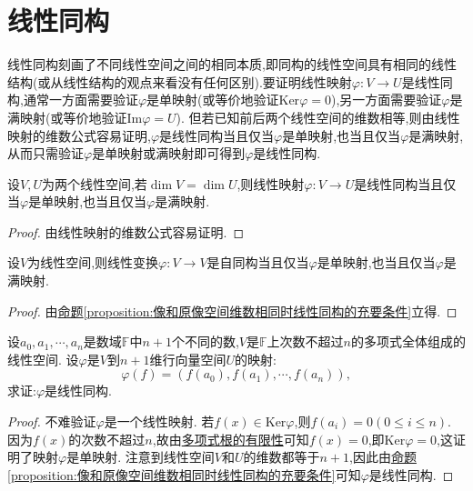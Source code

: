 \documentclass[lang=cn,newtx,10pt,scheme=chinese]{elegantbook}
\begin{document}
\section{线性同构}
线性同构刻画了不同线性空间之间的相同本质,即同构的线性空间具有相同的线性结构(或从线性结构的观点来看没有任何区别).要证明线性映射\(\varphi:V\to U\)是线性同构,通常一方面需要验证\(\varphi\)是单映射(或等价地验证\(\text{Ker}\varphi = 0\)),另一方面需要验证\(\varphi\)是满映射(或等价地验证\(\text{Im}\varphi = U\)). 但若已知前后两个线性空间的维数相等,则由线性映射的维数公式容易证明,\(\varphi\)是线性同构当且仅当\(\varphi\)是单映射,也当且仅当\(\varphi\)是满映射,从而只需验证\(\varphi\)是单映射或满映射即可得到\(\varphi\)是线性同构.

\begin{proposition}\label{proposition:像和原像空间维数相同时线性同构的充要条件}
设$V,U$为两个线性空间,若\(\dim V = \dim U\),则线性映射\(\varphi:V\rightarrow U\)是线性同构当且仅当\(\varphi\)是单映射,也当且仅当\(\varphi\)是满映射.
\end{proposition}
\begin{proof}
由线性映射的维数公式容易证明.
\end{proof}

\begin{corollary}\label{corollary:线性变换自同构的充要条件}
设$V$为线性空间,则线性变换\(\varphi:V\rightarrow V\)是自同构当且仅当\(\varphi\)是单映射,也当且仅当\(\varphi\)是满映射.
\end{corollary}
\begin{proof}
由\hyperref[proposition:像和原像空间维数相同时线性同构的充要条件]{命题\ref{proposition:像和原像空间维数相同时线性同构的充要条件}}立得.
\end{proof}

\begin{lemma}\label{lemma:证明Lagrange插值公式}
设\(a_0,a_1,\cdots,a_n\)是数域\(\mathbb{F}\)中\(n + 1\)个不同的数,\(V\)是\(\mathbb{F}\)上次数不超过\(n\)的多项式全体组成的线性空间. 设\(\varphi\)是\(V\)到\(n + 1\)维行向量空间\(U\)的映射:
\[
\varphi(f)=(f(a_0),f(a_1),\cdots,f(a_n)),
\]
求证:\(\varphi\)是线性同构.
\end{lemma}
\begin{proof}
不难验证\(\varphi\)是一个线性映射. 若\(f(x)\in\text{Ker}\varphi\),则\(f(a_i)=0(0\leq i\leq n)\). 因为\(f(x)\)的次数不超过\(n\),故由\hyperref[proposition:多项式根的有限性]{多项式根的有限性}可知\(f(x)=0\),即\(\text{Ker}\varphi = 0\),这证明了映射\(\varphi\)是单映射. 注意到线性空间\(V\)和\(U\)的维数都等于\(n + 1\),因此由\hyperref[proposition:像和原像空间维数相同时线性同构的充要条件]{命题\ref{proposition:像和原像空间维数相同时线性同构的充要条件}}可知\(\varphi\)是线性同构.
\end{proof}
\end{document}
